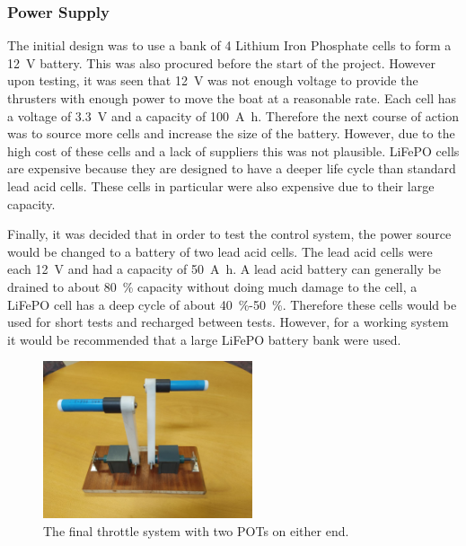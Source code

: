 		\subsubsection{Power Supply}
		The initial design was to use a bank of 4 Lithium Iron Phosphate cells to form a \SI{12}{\volt} battery. This was also procured before the start of the project. However upon testing, it was seen that \SI{12}{\volt} was not enough voltage to provide the thrusters with enough power to move the boat at a reasonable rate. Each cell has a voltage of \SI{3.3}{\volt} and a capacity of \SI{100}{\ampere\hour}. Therefore the next course of action was to source more cells and increase the size of the battery. However, due to the high cost of these cells and a lack of suppliers this was not plausible. LiFePO cells are expensive because they are designed to have a deeper life cycle than standard lead acid cells. These cells in particular were also expensive due to their large capacity.\par 
		Finally, it was decided that in order to test the control system, the power source would be changed to a battery of two lead acid cells. The lead acid cells were each \SI{12}{\volt} and had a capacity of \SI{50}{\ampere\hour}. A lead acid battery can generally be drained to about \SI{80}{\percent} capacity without doing much damage to the cell, a LiFePO cell has a deep cycle of about \SI{40}{\percent}-\SI{50}{\percent}. Therefore these cells would be used for short tests and recharged between tests. However, for a working system it would be recommended that a large LiFePO battery bank were used. 
		\begin{figure}[!ht]
			\begin{center}
				\includegraphics[width = 0.55\textwidth]{figures/throttle.jpg}
				\caption{The final throttle system with two POTs on either end.}
				\label{fig:3:throttle}
			\end{center}
		\end{figure}
